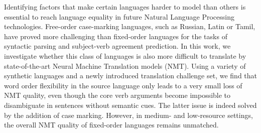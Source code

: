 Identifying factors that make certain languages harder to model than others is essential to reach language equality in future Natural Language Processing technologies. Free-order case-marking languages, such as Russian, Latin or Tamil, have proved more challenging than fixed-order languages for the tasks of syntactic parsing and subject-verb agreement prediction. In this work, we investigate whether this class of languages is also more difficult to translate by state-of-the-art Neural Machine Translation models (NMT). Using a variety of synthetic languages and a newly introduced translation challenge set, we find that word order flexibility in the source language only leads to a very small loss of NMT quality, even though the core verb arguments become impossible to disambiguate in sentences without semantic cues. The latter issue is indeed solved by the addition of case marking. However, in medium- and low-resource settings, the overall NMT quality of fixed-order languages remains unmatched.